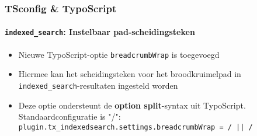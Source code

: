 \begin{frame}[fragile]
	\frametitle{TSconfig \& TypoScript}
	\framesubtitle{\texttt{indexed\_search}: Instelbaar pad-scheidingsteken}

	\lstset{basicstyle=\tiny\ttfamily}

	\begin{itemize}

		\item Nieuwe TypoScript-optie \texttt{breadcrumbWrap} is toegevoegd

		\item Hiermee kan het scheidingsteken voor het broodkruimelpad in \texttt{indexed\_search}-resultaten ingesteld worden

		\item Deze optie ondersteunt de \textbf{option split}-syntax uit TypoScript.\newline
			Standaardconfiguratie is "/":\newline
			\small
				\texttt{plugin.tx\_indexedsearch.settings.breadcrumbWrap = / || /}
			\normalsize

	\end{itemize}

\end{frame}

